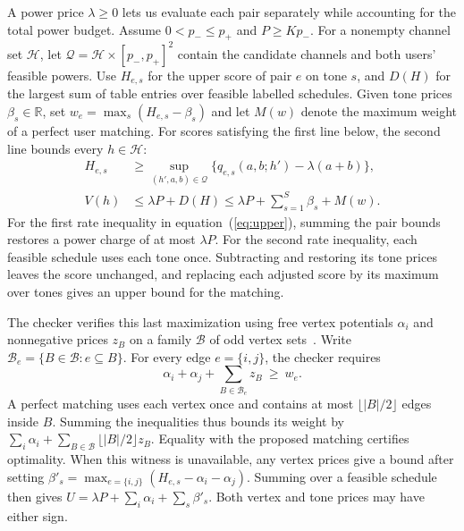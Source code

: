 \documentclass[lineno,pdflatex,sn-nature]{sn-jnl}
\begin{document}
A power price \(\lambda\geq0\) lets us evaluate each pair separately while accounting for the total power budget. Assume \(0<p_-\leq p_+\) and \(P\geq Kp_-\). For a nonempty channel set \(\mathcal H\), let \(\mathcal Q=\mathcal H\times[p_-,p_+]^2\) contain the candidate channels and both users' feasible powers. Use \(H_{e,s}\) for the upper score of pair \(e\) on tone \(s\), and \(D(H)\) for the largest sum of table entries over feasible labelled schedules. Given tone prices \(\beta_s\in\mathbb R\), set \(w_e=\max_s(H_{e,s}-\beta_s)\) and let \(M(w)\) denote the maximum weight of a perfect user matching. For scores satisfying the first line below, the second line bounds every \(h\in\mathcal H\):
\begin{equation}
\begin{aligned}
 H_{e,s} &\geq \sup_{(h',a,b)\in\mathcal Q}
       \bigl\{q_{e,s}(a,b;h')-\lambda(a+b)\bigr\},\\[2pt]
 V(h)&\leq\lambda P+D(H)\leq\lambda P+\sum_{s=1}^{S}\beta_s+M(w).
\end{aligned}
\label{eq:upper}
\end{equation}
For the first rate inequality in equation~(\ref{eq:upper}), summing the pair bounds restores a power charge of at most \(\lambda P\). For the second rate inequality, each feasible schedule uses each tone once. Subtracting and restoring its tone prices leaves the score unchanged, and replacing each adjusted score by its maximum over tones gives an upper bound for the matching.

The checker verifies this last maximization using free vertex potentials \(\alpha_i\) and nonnegative prices \(z_B\) on a family \(\mathcal B\) of odd vertex sets~\cite{edmonds}. Write \(\mathcal B_e=\{B\in\mathcal B:e\subseteq B\}\). For every edge \(e=\{i,j\}\), the checker requires
\[
 \alpha_i+\alpha_j+\sum_{B\in\mathcal B_e}z_B\ \geq\ w_e .
\]
A perfect matching uses each vertex once and contains at most \(\lfloor |B|/2\rfloor\) edges inside \(B\). Summing the inequalities thus bounds its weight by \(\sum_i\alpha_i+\sum_{B\in\mathcal B}\lfloor |B|/2\rfloor z_B\). Equality with the proposed matching certifies optimality. When this witness is unavailable, any vertex prices give a bound after setting \(\beta'_s=\max_{e=\{i,j\}}(H_{e,s}-\alpha_i-\alpha_j)\). Summing over a feasible schedule then gives \(U=\lambda P+\sum_i\alpha_i+\sum_s\beta'_s\). Both vertex and tone prices may have either sign.
\end{document}
